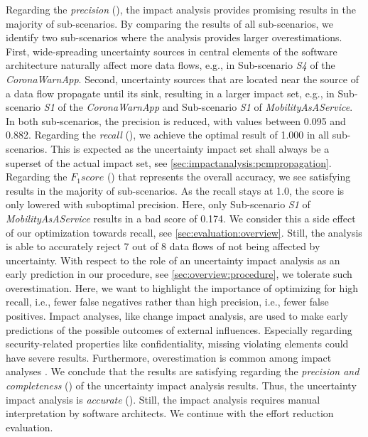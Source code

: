 Regarding the \emph{precision} (), the impact analysis provides promising results in the majority of sub-scenarios.
By comparing the results of all sub-scenarios, we identify two sub-scenarios where the analysis provides larger overestimations.
First, wide-spreading uncertainty sources in central elements of the software architecture naturally affect more data flows, e.g., in Sub-scenario \emph{S4} of the \emph{CoronaWarnApp}.
Second, uncertainty sources that are located near the source of a data flow propagate until its sink, resulting in a larger impact set, e.g., in Sub-scenario \emph{S1} of the \emph{CoronaWarnApp} and Sub-scenario \emph{S1} of \emph{MobilityAsAService}.
In both sub-scenarios, the precision is reduced, with values between 0.095 and 0.882.
Regarding the \emph{recall} (), we achieve the optimal result of 1.000 in all sub-scenarios.
This is expected as the uncertainty impact set shall always be a superset of the actual impact set, see \autoref{sec:impactanalysis:pcmpropagation}.
Regarding the $F_{1} score$ () that represents the overall accuracy, we see satisfying results in the majority of sub-scenarios.
As the recall stays at 1.0, the score is only lowered with suboptimal precision.
Here, only Sub-scenario \emph{S1} of \emph{MobilityAsAService} results in a bad score of 0.174.
We consider this a side effect of our optimization towards recall, see \autoref{sec:evaluation:overview}.
Still, the analysis is able to accurately reject 7 out of 8 data flows of not being affected by uncertainty.
With respect to the role of an uncertainty impact analysis as an early prediction in our procedure, see \autoref{sec:overview:procedure}, we tolerate such overestimation.
Here, we want to highlight the importance of optimizing for high recall, i.e., fewer false negatives rather than high precision, i.e., fewer false positives.
Impact analyses, like change impact analysis, are used to make early predictions of the possible outcomes of external influences.
Especially regarding security-related properties like confidentiality, missing violating elements could have severe results.
Furthermore, overestimation is common among impact analyses \cite{heinrich_architecture-based_2018,rostami_architecture-based_2017,benkler_architecture-based_2022}.
We conclude that the results are satisfying regarding the \emph{precision and completeness} () of the uncertainty impact analysis results.
Thus, the uncertainty impact analysis is \emph{accurate} ().
Still, the impact analysis requires manual interpretation by software architects.
We continue with the effort reduction evaluation.


